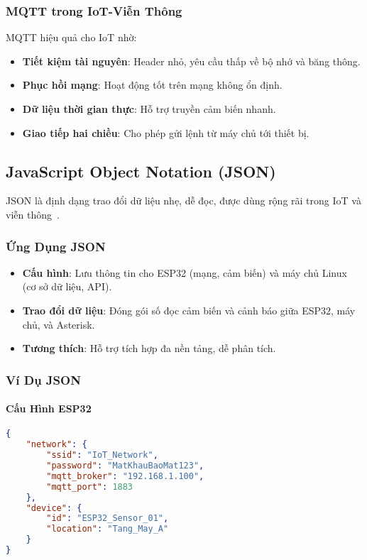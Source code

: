 \subsubsection{MQTT trong IoT-Viễn Thông}
\label{subsubsec:mqtt_iot_integration}

MQTT hiệu quả cho IoT nhờ:

\begin{itemize}
    \item \textbf{Tiết kiệm tài nguyên}: Header nhỏ, yêu cầu thấp về bộ nhớ và băng thông.
    \item \textbf{Phục hồi mạng}: Hoạt động tốt trên mạng không ổn định.
    \item \textbf{Dữ liệu thời gian thực}: Hỗ trợ truyền cảm biến nhanh.
    \item \textbf{Giao tiếp hai chiều}: Cho phép gửi lệnh từ máy chủ tới thiết bị.
\end{itemize}

\subsection{JavaScript Object Notation (JSON)}
\label{subsec:json_format}

JSON là định dạng trao đổi dữ liệu nhẹ, dễ đọc, được dùng rộng rãi trong IoT và viễn thông~\cite{json_rfc7159}.

\subsubsection{Ứng Dụng JSON}
\label{subsubsec:json_applications}

\begin{itemize}
    \item \textbf{Cấu hình}: Lưu thông tin cho ESP32 (mạng, cảm biến) và máy chủ Linux (cơ sở dữ liệu, API).
    \item \textbf{Trao đổi dữ liệu}: Đóng gói số đọc cảm biến và cảnh báo giữa ESP32, máy chủ, và Asterisk.
    \item \textbf{Tương thích}: Hỗ trợ tích hợp đa nền tảng, dễ phân tích.
\end{itemize}

\subsubsection{Ví Dụ JSON}
\label{subsubsec:json_examples}

\paragraph{Cấu Hình ESP32}
\begin{lstlisting}[language=json, caption=Cấu hình ESP32, label=lst:esp32_config]
{
    "network": {
        "ssid": "IoT_Network",          
        "password": "MatKhauBaoMat123",
        "mqtt_broker": "192.168.1.100", 
        "mqtt_port": 1883              
    },
    "device": {
        "id": "ESP32_Sensor_01",      
        "location": "Tang_May_A"     
    }
}
\end{lstlisting}

